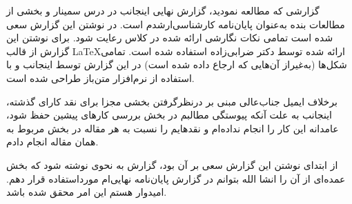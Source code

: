 

گزارشی که مطالعه نمودید، گزارش نهایی اینجانب در درس سمینار و بخشی از مطالعات بنده به‌عنوان پایان‌نامه کارشناسی‌ارشدم است. در نوشتن این گزارش سعی شده است تمامی نکات نگارشی ارائه شده در کلاس رعایت شود. برای نوشتن این گزارش از قالب \LaTeX ارائه شده توسط دکتر ضرابی‌زاده استفاده شده است. تمامی شکل‌ها (به‌غیراز آن‌هایی که ارجاع داده شده است) در این گزارش توسط اینجانب و با استفاده از نرم‌افزار متن‌باز  طراحی شده است.

برخلاف ایمیل جناب‌عالی مبنی بر درنظرگرفتن بخشی مجزا برای نقد کارای گذشته، اینجانب به علت آنکه پیوستگی مطالبم در بخش بررسی کارهای پیشین حفظ شود، عامدانه این کار را انجام نداده‌ام و نقدهایم را نسبت به هر مقاله در بخش مربوط به همان مقاله انجام دادم.


از ابتدای نوشتن این گزارش سعی بر آن بود، گزارش به نحوی نوشته شود که بخش عمده‌ای از آن را انشا الله بتوانم در گزارش پایان‌نامه نهایی‌ام مورداستفاده قرار دهم. امیدوار هستم این امر محقق شده باشد.